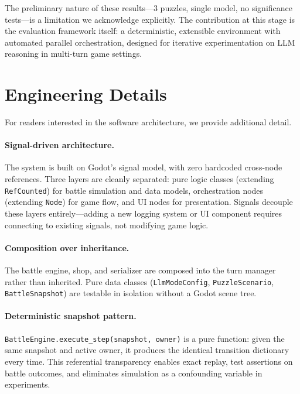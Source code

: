 \documentclass[11pt]{article}
\begin{document}
The preliminary nature of these results---3 puzzles, single model, no significance tests---is a limitation we acknowledge explicitly.
The contribution at this stage is the evaluation framework itself: a deterministic, extensible environment with automated parallel orchestration, designed for iterative experimentation on LLM reasoning in multi-turn game settings.

\appendix
\section{Engineering Details}\label{sec:appendix}

For readers interested in the software architecture, we provide additional detail.

\paragraph{Signal-driven architecture.}
The system is built on Godot's signal model, with zero hardcoded cross-node references.
Three layers are cleanly separated: pure logic classes (extending \texttt{RefCounted}) for battle simulation and data models, orchestration nodes (extending \texttt{Node}) for game flow, and UI nodes for presentation.
Signals decouple these layers entirely---adding a new logging system or UI component requires connecting to existing signals, not modifying game logic.

\paragraph{Composition over inheritance.}
The battle engine, shop, and serializer are composed into the turn manager rather than inherited.
Pure data classes (\texttt{LlmModeConfig}, \texttt{PuzzleScenario}, \texttt{BattleSnapshot}) are testable in isolation without a Godot scene tree.

\paragraph{Deterministic snapshot pattern.}
\texttt{BattleEngine.execute\_step(snapshot, owner)} is a pure function: given the same snapshot and active owner, it produces the identical transition dictionary every time.
This referential transparency enables exact replay, test assertions on battle outcomes, and eliminates simulation as a confounding variable in experiments.
\end{document}
